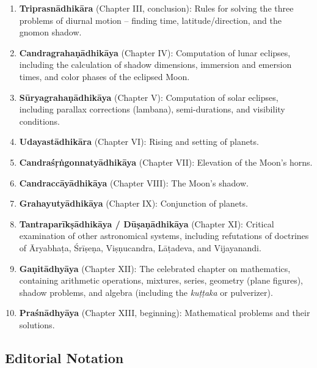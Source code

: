 \documentclass[11pt,a4paper]{article}
\begin{document}
\begin{enumerate}[label=\textbf{\arabic*.}]
  \item \textbf{Triprasnādhikāra} (Chapter III, conclusion): Rules for solving the three 
  problems of diurnal motion -- finding time, latitude/direction, and the gnomon shadow.
  
  \item \textbf{Candragrahaṇādhikāya} (Chapter IV): Computation of lunar eclipses, 
  including the calculation of shadow dimensions, immersion and emersion times, and color 
  phases of the eclipsed Moon.
  
  \item \textbf{Sūryagrahaṇādhikāya} (Chapter V): Computation of solar eclipses, 
  including parallax corrections (lambana), semi-durations, and visibility conditions.
  
  \item \textbf{Udayastādhikāra} (Chapter VI): Rising and setting of planets.
  
  \item \textbf{Candraśṛṅgonnatyādhikāya} (Chapter VII): Elevation of the Moon's horns.
  
  \item \textbf{Candraccāyādhikāya} (Chapter VIII): The Moon's shadow.
  
  \item \textbf{Grahayutyādhikāya} (Chapter IX): Conjunction of planets.
  
  \item \textbf{Tantraparīkṣādhikāya / Dūṣaṇādhikāya} (Chapter XI): Critical examination 
  of other astronomical systems, including refutations of doctrines of Āryabhaṭa, Śrīṣeṇa, 
  Viṣṇucandra, Lāṭadeva, and Vijayanandi.
  
  \item \textbf{Gaṇitādhyāya} (Chapter XII): The celebrated chapter on mathematics, 
  containing arithmetic operations, mixtures, series, geometry (plane figures), 
  shadow problems, and algebra (including the \textit{kuṭṭaka} or pulverizer).
  
  \item \textbf{Praśnādhyāya} (Chapter XIII, beginning): Mathematical problems and 
  their solutions.
\end{enumerate}

\subsection*{Editorial Notation}
\end{document}
